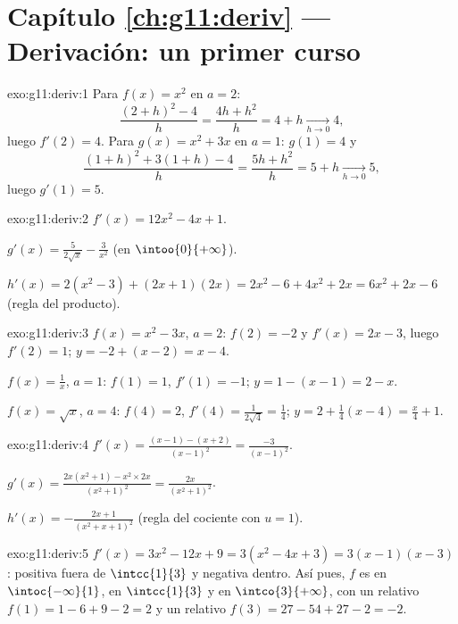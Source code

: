\section*{Capítulo \ref{ch:g11:deriv} --- Derivación: un primer curso}

\begin{solution}{exo:g11:deriv:1}
Para $f(x) = x^2$ en $a = 2$:
\[
\frac{(2+h)^2 - 4}{h} = \frac{4h + h^2}{h} = 4 + h
\xrightarrow[h\to0]{} 4,
\]
luego $f'(2) = 4$. Para $g(x) = x^2 + 3x$ en $a = 1$: $g(1) = 4$ y
\[
\frac{(1+h)^2 + 3(1+h) - 4}{h} = \frac{5h + h^2}{h} = 5 + h
\xrightarrow[h\to0]{} 5,
\]
luego $g'(1) = 5$.
\end{solution}

\begin{solution}{exo:g11:deriv:2}
$f'(x) = 12x^2 - 4x + 1$.

$g'(x) = \frac{5}{2\sqrt x} - \frac{3}{x^2}$ (en $\intoo{0}{+\infty}$).

$h'(x) = 2(x^2 - 3) + (2x+1)(2x) = 2x^2 - 6 + 4x^2 + 2x
= 6x^2 + 2x - 6$ (regla del producto).
\end{solution}

\begin{solution}{exo:g11:deriv:3}
$f(x) = x^2 - 3x$, $a = 2$: $f(2) = -2$ y $f'(x) = 2x - 3$, luego
$f'(2) = 1$;  $y = -2 + (x - 2) = x - 4$.

$f(x) = \frac1x$, $a = 1$: $f(1) = 1$, $f'(1) = -1$; 
$y = 1 - (x - 1) = 2 - x$.

$f(x) = \sqrt x$, $a = 4$: $f(4) = 2$,
$f'(4) = \frac{1}{2\sqrt4} = \frac14$; 
$y = 2 + \frac14(x - 4) = \frac{x}{4} + 1$.
\end{solution}

\begin{solution}{exo:g11:deriv:4}
$f'(x) = \frac{(x-1) - (x+2)}{(x-1)^2} = \frac{-3}{(x-1)^2}$.

$g'(x) = \frac{2x(x^2+1) - x^2 \times 2x}{(x^2+1)^2}
= \frac{2x}{(x^2+1)^2}$.

$h'(x) = -\frac{2x+1}{(x^2+x+1)^2}$ (regla del cociente con $u = 1$).
\end{solution}

\begin{solution}{exo:g11:deriv:5}
$f'(x) = 3x^2 - 12x + 9 = 3(x^2 - 4x + 3) = 3(x-1)(x-3)$: positiva fuera
de $\intcc{1}{3}$ y negativa dentro. Así pues, $f$ es  en
$\intoc{-\infty}{1}$,  en $\intcc{1}{3}$ y  en
$\intco{3}{+\infty}$, con un  relativo $f(1) = 1 - 6 + 9 - 2 = 2$ y
un  relativo $f(3) = 27 - 54 + 27 - 2 = -2$.
\end{solution}


